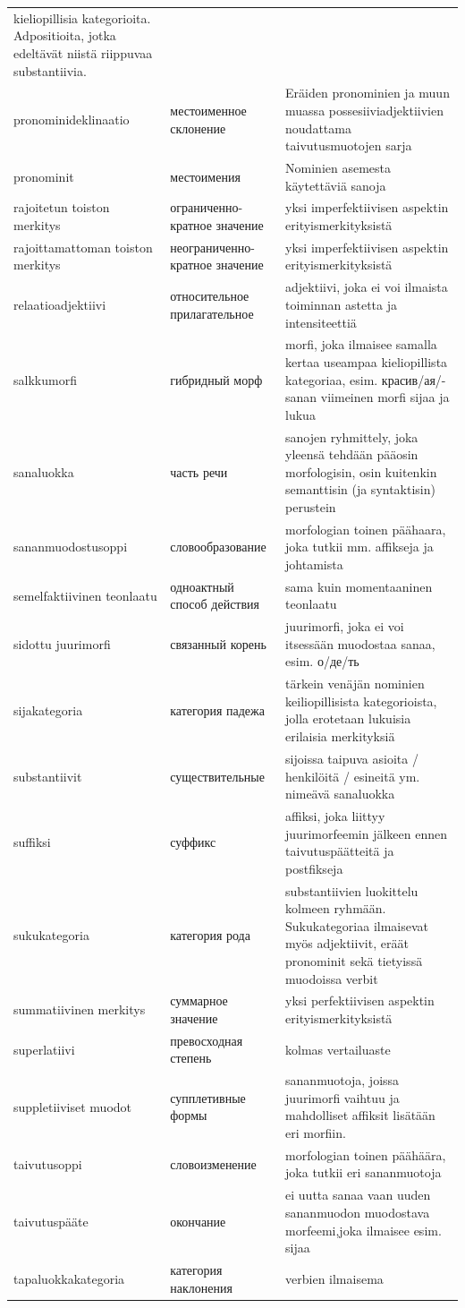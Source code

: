 \documentclass[]{scrreprt}
\begin{document}
\begin{longtable}[c]{p{4cm}p{4cm}p{7cm}}
kieliopillisia kategorioita. Adpositioita, jotka edeltävät niistä
riippuvaa substantiivia.\tabularnewline
pronominideklinaatio & местоименное склонение & Eräiden pronominien ja
muun muassa possesiiviadjektiivien noudattama taivutusmuotojen
sarja\tabularnewline
pronominit & местоимения & Nominien asemesta käytettäviä
sanoja\tabularnewline
rajoitetun toiston merkitys & ограниченно-кратное значение & yksi
imperfektiivisen aspektin erityismerkityksistä\tabularnewline
rajoittamattoman toiston merkitys & неограниченно-кратное значение &
yksi imperfektiivisen aspektin erityismerkityksistä\tabularnewline
relaatioadjektiivi & относительное прилагательное & adjektiivi, joka ei
voi ilmaista toiminnan astetta ja intensiteettiä\tabularnewline
salkkumorfi & гибридный морф & morfi, joka ilmaisee samalla kertaa
useampaa kieliopillista kategoriaa, esim. красив/ая/-sanan viimeinen
morfi sijaa ja lukua\tabularnewline
sanaluokka & часть речи & sanojen ryhmittely, joka yleensä tehdään
pääosin morfologisin, osin kuitenkin semanttisin (ja syntaktisin)
perustein\tabularnewline
sananmuodostusoppi & словообразование & morfologian toinen päähaara,
joka tutkii mm. affikseja ja johtamista\tabularnewline
semelfaktiivinen teonlaatu & одноактный способ действия & sama kuin
momentaaninen teonlaatu\tabularnewline
sidottu juurimorfi & связанный корень & juurimorfi, joka ei voi
itsessään muodostaa sanaa, esim. о/де/ть\tabularnewline
sijakategoria & категория падежа & tärkein venäjän nominien
keiliopillisista kategorioista, jolla erotetaan lukuisia erilaisia
merkityksiä\tabularnewline
substantiivit & существительные & sijoissa taipuva asioita / henkilöitä
/ esineitä ym. nimeävä sanaluokka\tabularnewline
suffiksi & суффикс & affiksi, joka liittyy juurimorfeemin jälkeen ennen
taivutuspäätteitä ja postfikseja\tabularnewline
sukukategoria & категория рода & substantiivien luokittelu kolmeen
ryhmään. Sukukategoriaa ilmaisevat myös adjektiivit, eräät pronominit
sekä tietyissä muodoissa verbit\tabularnewline
summatiivinen merkitys & суммарное значение & yksi perfektiivisen
aspektin erityismerkityksistä\tabularnewline
superlatiivi & превосходная степень & kolmas vertailuaste\tabularnewline
suppletiiviset muodot & супплетивные формы & sananmuotoja, joissa
juurimorfi vaihtuu ja mahdolliset affiksit lisätään eri
morfiin.\tabularnewline
taivutusoppi & словоизменение & morfologian toinen päähäära, joka tutkii
eri sananmuotoja\tabularnewline
taivutuspääte & окончание & ei uutta sanaa vaan uuden sananmuodon
muodostava morfeemi,joka ilmaisee esim. sijaa\tabularnewline
tapaluokkakategoria & категория наклонения & verbien ilmaisema

\end{longtable}
\end{document}
